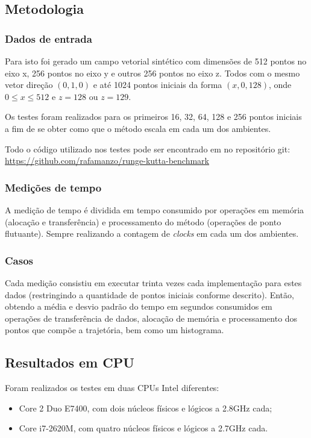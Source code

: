   \subsection{Metodologia}
    \subsubsection{Dados de entrada}
    Para isto foi gerado um campo vetorial sintético com dimensões de 512 pontos no eixo x, 256 pontos no eixo y e outros 256 pontos no eixo z. Todos com o mesmo vetor direção $(0, 1, 0)$ e até 1024 pontos iniciais da forma $(x, 0, 128)$, onde $0 \leq x \leq 512$ e $z = 128$ ou $z = 129$.
    
    Os testes foram realizados para os primeiros 16, 32, 64, 128 e 256 pontos iniciais a fim de se obter como que o método escala em cada um dos ambientes.
    
    Todo o código utilizado nos testes pode ser encontrado em no repositório git: \href{https://github.com/rafamanzo/runge-kutta-benchmark}{https://github.com/rafamanzo/runge-kutta-benchmark}
    
    \subsubsection{Medições de tempo}
    A medição de tempo é dividida em tempo consumido por operações em memória (alocação e transferência) e processamento do método (operações de ponto flutuante). Sempre realizando a contagem de \textit{clocks} em cada um dos ambientes.
    
    \subsubsection{Casos}
    Cada medição consistiu em executar trinta vezes cada implementação para estes dados (restringindo a quantidade de pontos iniciais conforme descrito). Então, obtendo a média e desvio padrão do tempo em segundos consumidos em operações de transferência de dados, alocação de memória e processamento dos pontos que compõe a trajetória, bem como um histograma.

  \subsection{Resultados em CPU}
  Foram realizados os testes em duas CPUs Intel diferentes:
  \begin{itemize}
    \item Core 2 Duo E7400, com dois núcleos físicos e lógicos a 2.8GHz cada;
    \item Core i7-2620M, com quatro núcleos físicos e lógicos a 2.7GHz cada.
  \end{itemize}
  
